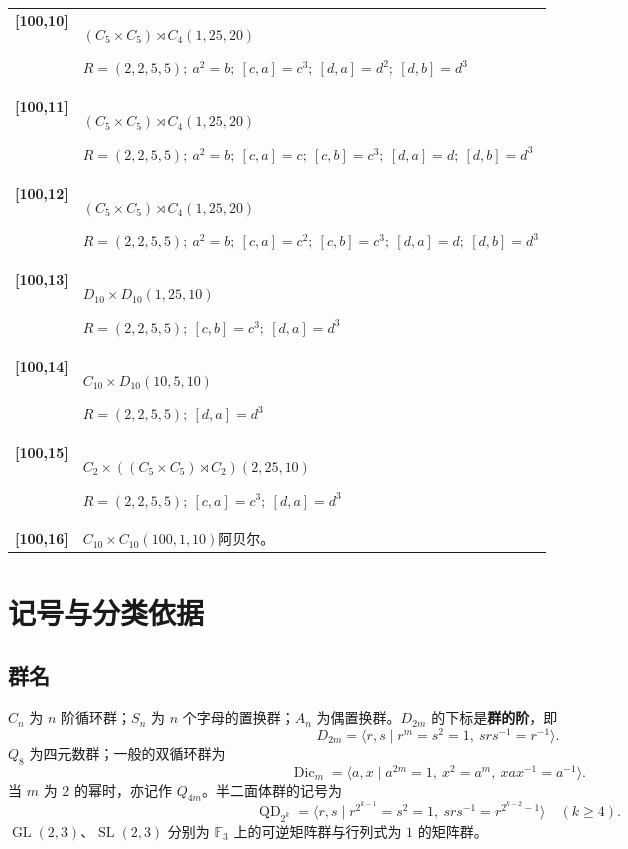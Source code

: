 \documentclass[UTF8,fontset=fandol,11pt,a4paper]{ctexart}
\begin{document}
\begin{longtable}{@{}p{17mm}>{\raggedright\arraybackslash}p{141mm}@{}}
\textbf{[100,10]} & $(C_{5}\times C_{5})\rtimes C_{4}$\quad $(1,25,20)$\par\(R=(2,2,5,5);\allowbreak\ a^{2}=b;\allowbreak\ [c,a]=c^{3};\allowbreak\ [d,a]=d^{2};\allowbreak\ [d,b]=d^{3}\)\\[3pt]

\textbf{[100,11]} & $(C_{5}\times C_{5})\rtimes C_{4}$\quad $(1,25,20)$\par\(R=(2,2,5,5);\allowbreak\ a^{2}=b;\allowbreak\ [c,a]=c;\allowbreak\ [c,b]=c^{3};\allowbreak\ [d,a]=d;\allowbreak\ [d,b]=d^{3}\)\\[3pt]

\textbf{[100,12]} & $(C_{5}\times C_{5})\rtimes C_{4}$\quad $(1,25,20)$\par\(R=(2,2,5,5);\allowbreak\ a^{2}=b;\allowbreak\ [c,a]=c^{2};\allowbreak\ [c,b]=c^{3};\allowbreak\ [d,a]=d;\allowbreak\ [d,b]=d^{3}\)\\[3pt]

\textbf{[100,13]} & $D_{10}\times D_{10}$\quad $(1,25,10)$\par\(R=(2,2,5,5);\allowbreak\ [c,b]=c^{3};\allowbreak\ [d,a]=d^{3}\)\\[3pt]

\textbf{[100,14]} & $C_{10}\times D_{10}$\quad $(10,5,10)$\par\(R=(2,2,5,5);\allowbreak\ [d,a]=d^{3}\)\\[3pt]

\textbf{[100,15]} & $C_{2}\times ((C_{5}\times C_{5})\rtimes C_{2})$\quad $(2,25,10)$\par\(R=(2,2,5,5);\allowbreak\ [c,a]=c^{3};\allowbreak\ [d,a]=d^{3}\)\\[3pt]

\textbf{[100,16]} & $C_{10}\times C_{10}$\quad $(100,1,10)$\quad 阿贝尔。\\[3pt]

\end{longtable}\endgroup

\clearpage\section*{记号与分类依据}

\subsection*{群名}
$C_n$ 为 $n$ 阶循环群；$S_n$ 为 $n$ 个字母的置换群；$A_n$ 为偶置换群。$D_{2m}$ 的下标是\textbf{群的阶}，即
\[D_{2m}=\langle r,s\mid r^m=s^2=1,\ srs^{-1}=r^{-1}\rangle.\]
$Q_8$ 为四元数群；一般的双循环群为
\[\operatorname{Dic}_m=\langle a,x\mid a^{2m}=1,\ x^2=a^m,\ xax^{-1}=a^{-1}\rangle.\]
当 $m$ 为 $2$ 的幂时，亦记作 $Q_{4m}$。半二面体群的记号为
\[\operatorname{QD}_{2^k}=\langle r,s\mid r^{2^{k-1}}=s^2=1,\ srs^{-1}=r^{2^{k-2}-1}\rangle\quad(k\geq4).\]
$\operatorname{GL}(2,3)$、$\operatorname{SL}(2,3)$ 分别为 $\mathbb F_3$ 上的可逆矩阵群与行列式为 $1$ 的矩阵群。
\end{document}
